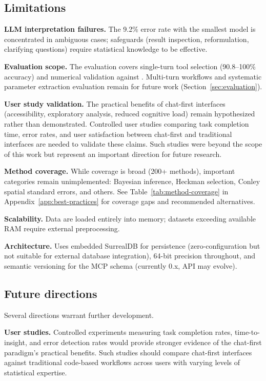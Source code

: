 \subsection{Limitations}

\textbf{LLM interpretation failures.} The 9.2\% error rate with the smallest
model is concentrated in ambiguous cases; safeguards (result inspection,
reformulation, clarifying questions) require statistical knowledge to be effective.

\textbf{Evaluation scope.} The evaluation covers single-turn tool selection
(90.8--100\% accuracy) and numerical validation against .
Multi-turn workflows and systematic parameter extraction evaluation
remain for future work (Section~\ref{sec:evaluation}).

\textbf{User study validation.} The practical benefits of chat-first interfaces
(accessibility, exploratory analysis, reduced cognitive load) remain hypothesized
rather than demonstrated. Controlled user studies comparing task completion time,
error rates, and user satisfaction between chat-first and traditional interfaces
are needed to validate these claims. Such studies were beyond the scope of this
work but represent an important direction for future research.

\textbf{Method coverage.} While coverage is broad (200+ methods), important
categories remain unimplemented: Bayesian inference, Heckman selection, Conley
spatial standard errors, and others. See Table~\ref{tab:method-coverage} in
Appendix~\ref{app:best-practices} for coverage gaps and recommended alternatives.

\textbf{Scalability.} Data are loaded entirely into memory; datasets exceeding
available RAM require external preprocessing.

\textbf{Architecture.} Uses embedded SurrealDB for persistence (zero-configuration
but not suitable for external database integration), 64-bit precision throughout,
and semantic versioning for the MCP schema (currently 0.x, API may evolve).

\subsection{Future directions}

Several directions warrant further development.

\textbf{User studies.} Controlled experiments measuring task completion rates,
time-to-insight, and error detection rates would provide stronger evidence of
the chat-first paradigm's practical benefits. Such studies should compare
chat-first interfaces against traditional code-based workflows across users
with varying levels of statistical expertise.

